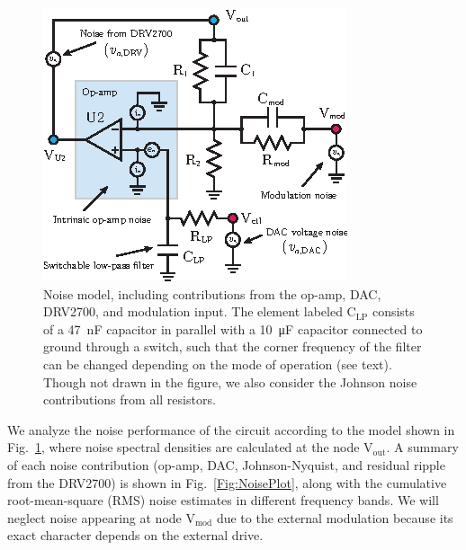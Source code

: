 \documentclass[aip,rsi,reprint]{revtex4-1} %
\begin{document}
\begin{figure}[t]
\includegraphics[width=\columnwidth]{NoiseModel}
\caption{Noise model, including contributions from the op-amp, DAC, DRV2700, and modulation input. The element labeled $\text{C}_\text{LP}$ consists of a \SI{47}{\nano\farad} capacitor in parallel with a \SI{10}{\micro\farad} capacitor connected to ground through a switch, such that the corner frequency of the filter can be changed depending on the mode of operation  (see text). Though not drawn in the figure, we also consider the Johnson noise contributions from all resistors.
\label{Fig:NoiseModel}}
\end{figure}

We analyze the noise performance of the circuit according to the model shown in Fig.~\ref{Fig:NoiseModel}, where noise spectral densities are calculated at the node $\text{V}_\text{out}$.
A summary of each noise contribution (op-amp, DAC, Johnson-Nyquist, and residual ripple from the DRV2700) is shown in Fig.~\ref{Fig:NoisePlot}, along with the cumulative root-mean-square (RMS) noise estimates in different frequency bands.
We will neglect noise appearing at node $\text{V}_\text{mod}$ due to the external modulation because its exact character depends on the external drive.
\end{document}
